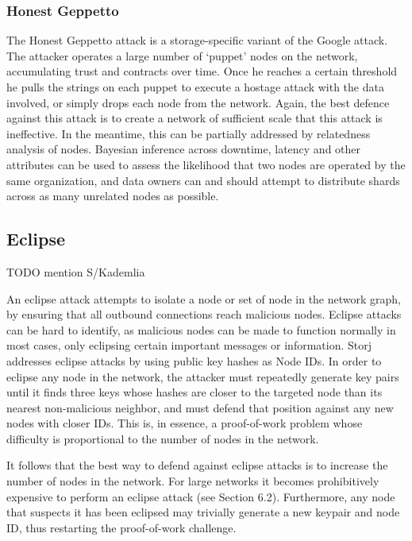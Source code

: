 \documentclass[a4paper,10pt]{article}
\newcommand{\todo}[1]{{\color{red} TODO #1}}
\begin{document}
\subsubsection{Honest Geppetto}

The Honest Geppetto attack is a storage-specific variant of the Google attack.
The attacker operates a large number of ‘puppet’ nodes on the network,
accumulating trust and contracts over time. Once he reaches a certain threshold
he pulls the strings on each puppet to execute a hostage attack with the data
involved, or simply drops each node from the network. Again, the best defence
against this attack is to create a network of sufficient scale that this attack
is ineffective. In the meantime, this can be partially addressed by relatedness
analysis of nodes. Bayesian inference across downtime, latency and other
attributes can be used to assess the likelihood that two nodes are operated by
the same organization, and data owners can and should attempt to distribute
shards across as many unrelated nodes as possible.

\subsection{Eclipse}

\todo{mention S/Kademlia

An eclipse attack attempts to isolate a node or set of node in the network
graph, by ensuring that all outbound connections reach malicious nodes. Eclipse
attacks can be hard to identify, as malicious nodes can be made to function
normally in most cases, only eclipsing certain important messages or
information. Storj addresses eclipse attacks by using public key hashes as Node
IDs. In order to eclipse any node in the network, the attacker must repeatedly
generate key pairs until it finds three keys whose hashes are closer to the
targeted node than its nearest non-malicious neighbor, and must defend that
position against any new nodes with closer IDs. This is, in essence, a
proof-of-work problem whose difficulty is proportional to the number of nodes in
the network.

It follows that the best way to defend against eclipse attacks is to increase
the number of nodes in the network. For large networks it becomes prohibitively
expensive to perform an eclipse attack (see Section 6.2). Furthermore, any node
that suspects it has been eclipsed may trivially generate a new keypair and node
ID, thus restarting the proof-of-work challenge.
}
\end{document}
